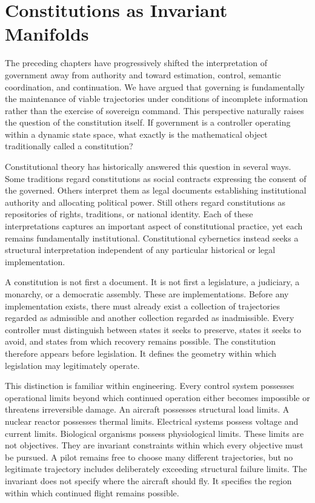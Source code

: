 \documentclass[12pt,a4paper]{article}
\begin{document}
\section{Constitutions as Invariant Manifolds}

The preceding chapters have progressively shifted the interpretation of government away from authority and toward estimation, control, semantic coordination, and continuation. We have argued that governing is fundamentally the maintenance of viable trajectories under conditions of incomplete information rather than the exercise of sovereign command. This perspective naturally raises the question of the constitution itself. If government is a controller operating within a dynamic state space, what exactly is the mathematical object traditionally called a constitution?

Constitutional theory has historically answered this question in several ways. Some traditions regard constitutions as social contracts expressing the consent of the governed. Others interpret them as legal documents establishing institutional authority and allocating political power. Still others regard constitutions as repositories of rights, traditions, or national identity. Each of these interpretations captures an important aspect of constitutional practice, yet each remains fundamentally institutional. Constitutional cybernetics instead seeks a structural interpretation independent of any particular historical or legal implementation.

A constitution is not first a document. It is not first a legislature, a judiciary, a monarchy, or a democratic assembly. These are implementations. Before any implementation exists, there must already exist a collection of trajectories regarded as admissible and another collection regarded as inadmissible. Every controller must distinguish between states it seeks to preserve, states it seeks to avoid, and states from which recovery remains possible. The constitution therefore appears before legislation. It defines the geometry within which legislation may legitimately operate.

This distinction is familiar within engineering. Every control system possesses operational limits beyond which continued operation either becomes impossible or threatens irreversible damage. An aircraft possesses structural load limits. A nuclear reactor possesses thermal limits. Electrical systems possess voltage and current limits. Biological organisms possess physiological limits. These limits are not objectives. They are invariant constraints within which every objective must be pursued. A pilot remains free to choose many different trajectories, but no legitimate trajectory includes deliberately exceeding structural failure limits. The invariant does not specify where the aircraft should fly. It specifies the region within which continued flight remains possible.
\end{document}
